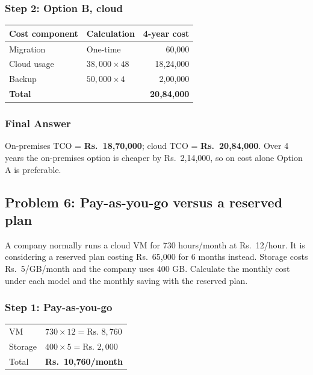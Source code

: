 \documentclass[11pt,a4paper]{article}
\begin{document}
\subsubsection*{Step 2: Option B, cloud}

\begin{tabularx}{\textwidth}{@{}lXr@{}}
\toprule
\rowcolor{tablehead}\textbf{Cost component} & \textbf{Calculation} & \textbf{4-year cost} \\
\midrule
Migration & One-time & 60,000 \\
Cloud usage & $38{,}000 \times 48$ & 18,24,000 \\
Backup & $50{,}000 \times 4$ & 2,00,000 \\
\midrule
\textbf{Total} & & \textbf{20,84,000} \\
\bottomrule
\end{tabularx}

\subsubsection*{Final Answer}

On-premises TCO = \textbf{Rs.\ 18,70,000}; cloud TCO = \textbf{Rs.\ 20,84,000}. Over 4 years
the on-premises option is cheaper by Rs.\ 2,14,000, so on cost alone Option A is preferable.

\subsection*{Problem 6: Pay-as-you-go versus a reserved plan}

A company normally runs a cloud VM for 730 hours/month at Rs.\ 12/hour. It is considering a
reserved plan costing Rs.\ 65,000 for 6 months instead. Storage costs Rs.\ 5/GB/month and the
company uses 400 GB. Calculate the monthly cost under each model and the monthly saving with
the reserved plan.

\subsubsection*{Step 1: Pay-as-you-go}

\begin{tabularx}{\textwidth}{@{}lX@{}}
VM & $730 \times 12 = \text{Rs. } 8{,}760$ \\
Storage & $400 \times 5 = \text{Rs. } 2{,}000$ \\
Total & \textbf{Rs.\ 10,760/month} \\
\end{tabularx}
\end{document}
